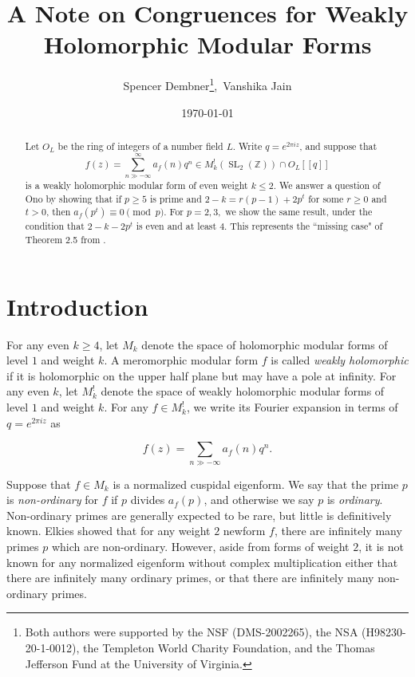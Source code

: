 \documentclass[11pt]{article}
\newcommand{\bbZ}{\mathbb{Z}}
\theoremstyle{definition}
\numberwithin{equation}{subsection}
\begin{document}
\pagestyle{plain}

\author{Spencer Dembner\thanks{Both authors were supported by the NSF (DMS-2002265), the NSA (H98230-20-1-0012), the Templeton World Charity Foundation, and the Thomas Jefferson Fund at the University of Virginia.},\, Vanshika Jain\footnotemark[1]}
\title{A Note on Congruences for Weakly Holomorphic Modular Forms}
\date{\today}

\maketitle



\begin{abstract}

Let $O_L$ be the ring of integers of a number field $L$. Write $q = e^{2 \pi i z}$, and suppose that
$$ f(z) = \sum_{n \gg - \infty}^{\infty} a_f(n) q^n \in M_{k}^{!}(\operatorname{SL}_2(\bbZ)) \cap O_L[[q]] $$
is a weakly holomorphic modular form of even weight $k \leq 2$. We answer a question of Ono by showing that if $p \geq 5$ is prime and $ 2-k = r(p-1) + 2 p^t$ for some $r \geq 0$ and $t > 0$, then $a_f(p^t) \equiv 0 \pmod p$. For $p = 2,3,$ we show the same result, under the condition that $2 - k - 2 p^t$ is even and at least $4$. This represents the ``missing case" of Theorem 2.5 from \cite{Seokho2016note}.
\end{abstract}

\section{Introduction}

For any even $k \geq 4$, let $M_k$ denote the space of holomorphic modular forms of level $1$ and weight $k$. A meromorphic modular form $f$ is called \emph{weakly holomorphic} if it is holomorphic on the upper half plane but may have a pole at infinity. For any even $k$, let $M_k^{!}$ denote the space of weakly holomorphic modular forms of level $1$ and weight $k$. For any $f \in M_k^!$, we write its Fourier expansion in terms of $q = e^{2 \pi i z}$ as

$$ f(z) = \sum_{n \gg - \infty} a_f(n) q^n.$$

Suppose that $f \in M_k$ is a normalized cuspidal eigenform. We say that the prime $p$ is \emph{non-ordinary} for $f$ if $p$ divides $a_f(p)$, and otherwise we say $p$ is \emph{ordinary}. Non-ordinary primes are generally expected to be rare, but little is definitively known. Elkies \cite{Elkies1987existence} showed that for any weight $2$ newform $f$, there are infinitely many primes $p$ which are non-ordinary. However, aside from forms of weight $2$, it is not known for any normalized eigenform without complex multiplication either that there are infinitely many ordinary primes, or that there are infinitely many non-ordinary primes.
\end{document}
